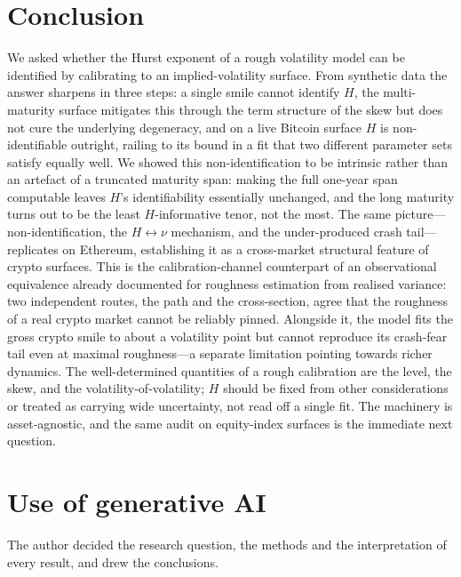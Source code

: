 \documentclass[11pt]{article}
\begin{document}
\section{Conclusion}\label{sec:conclusion}

We asked whether the Hurst exponent of a rough volatility model can be identified by calibrating to an
implied-volatility surface. From synthetic data the answer sharpens in three steps: a single smile
cannot identify $H$, the multi-maturity surface mitigates this through the term structure of the skew
but does not cure the underlying degeneracy, and on a live Bitcoin surface $H$ is non-identifiable
outright, railing to its bound in a fit that two different parameter sets satisfy
equally well. We showed this non-identification to be intrinsic rather than an artefact of a truncated
maturity span: making the full one-year span computable leaves $H$'s identifiability essentially
unchanged, and the long maturity turns out to be the least $H$-informative tenor, not the most. The
same picture---non-identification, the $H\leftrightarrow\nu$ mechanism, and the under-produced crash
tail---replicates on Ethereum, establishing it as a cross-market structural feature of crypto surfaces.
This is the calibration-channel counterpart of an observational equivalence already documented for
roughness estimation from realised variance: two independent routes, the path and the cross-section,
agree that the roughness of a real crypto market cannot be reliably pinned. Alongside it, the model
fits the gross crypto smile to about a volatility point but cannot reproduce its crash-fear tail even
at maximal roughness---a separate limitation pointing towards richer dynamics. The well-determined
quantities of a rough calibration are the level, the skew, and the volatility-of-volatility; $H$
should be fixed from other considerations or treated as carrying wide uncertainty, not read off a
single fit. The machinery is asset-agnostic, and the same audit on equity-index surfaces is the
immediate next question.

\section*{Use of generative AI}
The author decided the research question, the methods and the interpretation of every
result, and drew the conclusions.
\end{document}
